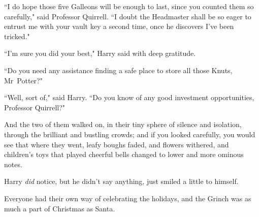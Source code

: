 ``I do hope those five Galleons will be enough to last, since you counted them so carefully," said Professor Quirrell. ``I doubt the Headmaster shall be so eager to entrust me with your vault key a second time, once he discovers I've been tricked."

``I'm sure you did your best," Harry said with deep gratitude.

``Do you need any assistance finding a safe place to store all those Knuts, Mr~Potter?"

``Well, sort of," said Harry. ``Do you know of any good investment opportunities, Professor Quirrell?"

And the two of them walked on, in their tiny sphere of silence and isolation, through the brilliant and bustling crowds; and if you looked carefully, you would see that where they went, leafy boughs faded, and flowers withered, and children's toys that played cheerful bells changed to lower and more ominous notes.

Harry \emph{did} notice, but he didn't say anything, just smiled a little to himself.

Everyone had their own way of celebrating the holidays, and the Grinch was as much a part of Christmas as Santa.

